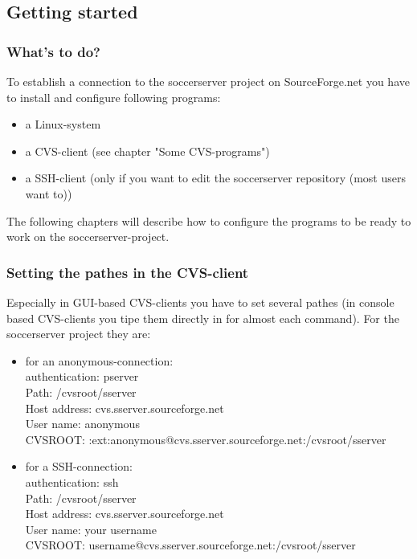 \subsection{Getting started}

\subsubsection{What's to do?}

To establish a connection to the soccerserver project on SourceForge.net you have to install and configure following programs:

\begin{itemize}
\item a Linux-system
\item a CVS-client (see chapter "Some CVS-programs")
\item a SSH-client (only if you want to edit the soccerserver repository (most users want to))
\end{itemize}

The following chapters will describe how to configure the programs to be ready to work on the soccerserver-project. 

\subsubsection{Setting the pathes in the CVS-client}

Especially in GUI-based CVS-clients you have to set several pathes (in console based CVS-clients you tipe them directly in for almost each command). For the soccerserver project they are:

\begin{itemize}
\item for an anonymous-connection:\\
authentication:	pserver\\
Path: /cvsroot/sserver\\
Host address: cvs.sserver.sourceforge.net\\
User name: anonymous\\
CVSROOT: :ext:anonymous@cvs.sserver.sourceforge.net:/cvsroot/sserver\\

\item for a SSH-connection:\\
authentication: ssh\\
Path: /cvsroot/sserver\\
Host address: cvs.sserver.sourceforge.net\\
User name: your username\\
CVSROOT: username@cvs.sserver.sourceforge.net:/cvsroot/sserver\\

\end{itemize}

